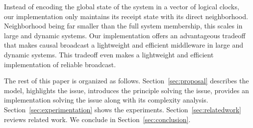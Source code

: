 Instead of encoding the global state of the system in a vector of logical
clocks, our implementation only maintains its receipt state with its direct
neighborhood. Neighborhood being far smaller than the full system membership,
this scales in large and dynamic systems.  Our implementation offers an
advantageous tradeoff that makes causal broadcast a lightweight and efficient
middleware in large and dynamic systems. This tradeoff even makes a lightweight
and efficient implementation of reliable broadcast.

The rest of this paper is organized as follows. 
Section~\ref{sec:proposal} describes the model, highlights the issue, introduces
the principle solving the issue, provides an implementation solving the issue
along with its complexity analysis. Section~\ref{sec:experimentation} shows the
experiments. Section~\ref{sec:relatedwork} reviews related work. We conclude in
Section~\ref{sec:conclusion}.


